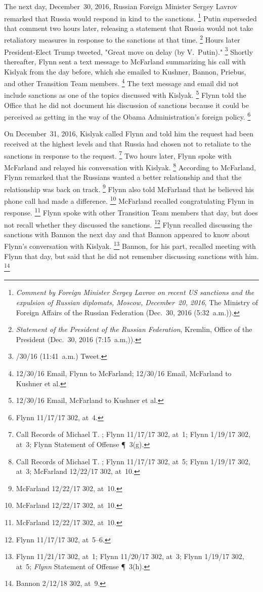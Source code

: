 The next day, December~30, 2016, Russian Foreign Minister Sergey Lavrov remarked that Russia would respond in kind to the sanctions.%
\footnote{\textit{Comment by Foreign Minister Sergey Lavrov on recent US sanctions and the expulsion of Russian diplomats, Moscow, December~20, 2016}, The Ministry of Foreign Affairs of the Russian Federation (Dec.~30, 2016 (5:32~a.m.)).}
Putin superseded that comment two hours later, releasing a statement that Russia would not take retaliatory measures in response to the sanctions at that time.%
\footnote{\textit{Statement of the President of the Russian Federation}, Kremlin, Office of the President (Dec.~30, 2016 (7:15~a.m,)).}
Hours later President-Elect Trump tweeted, "Great move on delay (by V.~Putin)."%
\footnote{/30/16 (11:41~a.m.) Tweet.}
Shortly thereafter, Flynn sent a text message to McFarland summarizing his call with Kislyak from the day before, which she emailed to Kushner, Bannon, Priebus, and other Transition Team members.%
\footnote{12/30/16 Email, Flynn to McFarland;
12/30/16 Email, McFarland to Kushner et al.}
The text message and email did not include sanctions as one of the topics discussed with Kislyak.%
\footnote{12/30/16 Email, McFarland to Kushner et al.}
Flynn told the Office that he did not document his discussion of sanctions because it could be perceived as getting in the way of the Obama Administration's foreign policy.%
\footnote{Flynn 11/17/17 302, at~4.}

On December~31, 2016, Kislyak called Flynn and told him the request had been received at the highest levels and that Russia had chosen not to retaliate to the sanctions in response to the request.%
\footnote{Call Records of Michael T. ;
Flynn 11/17/17 302, at~1;
Flynn 1/19/17 302, at~3;
Flynn Statement of Offense \P~3(g).}
Two hours later, Flynn spoke with McFarland and relayed his conversation with Kislyak.%
\footnote{Call Records of Michael T. ;
Flynn 11/17/17 302, at~5;
Flynn 1/19/17 302, at~3;
McFarland 12/22/17 302, at~10.}
According to McFarland, Flynn remarked that the Russians wanted a better relationship and that the relationship was back on track.%
\footnote{McFarland 12/22/17 302, at~10.}
Flynn also told McFarland that he believed his phone call had made a difference.%
\footnote{McFarland 12/22/17 302, at~10.}
McFarland recalled congratulating Flynn in response.%
\footnote{McFarland 12/22/17 302, at~10.}
Flynn spoke with other Transition Team members that day, but does not recall whether they discussed the sanctions.%
\footnote{Flynn 11/17/17 302, at~5--6.}
Flynn recalled discussing the sanctions with Bannon the next day and that Bannon appeared to know about Flynn's conversation with Kislyak.%
\footnote{Flynn 11/21/17 302, at~1;
Flynn 11/20/17 302, at~3;
Flynn 1/19/17 302, at~5;
\textit{Flynn} Statement of Offense \P~3(h).}
Bannon, for his part, recalled meeting with Flynn that day, but said that he did not remember discussing sanctions with him.%
\footnote{Bannon 2/12/18 302, at~9.}


